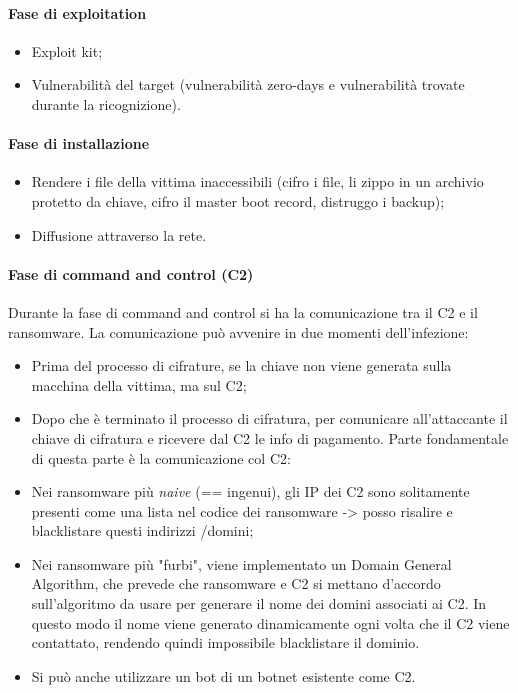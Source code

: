 \paragraph{Fase di exploitation}
\begin{itemize}
    \item Exploit kit;
    \item Vulnerabilità del target (vulnerabilità zero-days e vulnerabilità trovate durante la ricognizione).
\end{itemize}

\paragraph{Fase di installazione}
\begin{itemize}
    \item Rendere i file della vittima inaccessibili (cifro i file, li zippo in un archivio protetto da chiave, cifro il master boot record, distruggo i backup);
    \item Diffusione attraverso la rete.
\end{itemize}

\paragraph{Fase di command and control (C2)}
Durante la fase di command and control si ha la comunicazione tra il C2 e il ransomware. La comunicazione può avvenire in due momenti dell'infezione: 
\begin{itemize}
    \item Prima del processo di cifrature, se la chiave non viene generata sulla macchina della vittima, ma sul C2;
    \item Dopo che è terminato il processo di cifratura, per comunicare all'attaccante il chiave di cifratura e ricevere dal C2 le info di pagamento.
    Parte fondamentale di questa parte è la comunicazione col C2: 
    \item Nei ransomware più \textit{naive} (== ingenui), gli IP dei C2 sono solitamente presenti come una lista nel codice dei ransomware -> posso risalire e blacklistare questi indirizzi /domini;
    \item Nei ransomware più "furbi", viene implementato un Domain General Algorithm, che prevede che ransomware e C2 si mettano d'accordo sull'algoritmo da usare per generare il nome dei domini associati ai C2. In questo modo il nome viene generato dinamicamente ogni volta che il C2 viene contattato, rendendo quindi impossibile blacklistare il dominio. 
    \item Si può anche utilizzare un bot di un botnet esistente come C2.
\end{itemize}

